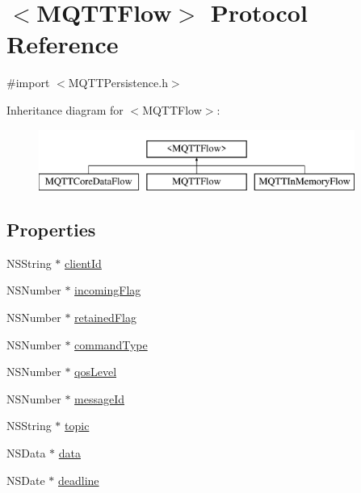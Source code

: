 \hypertarget{protocol_m_q_t_t_flow-p}{}\section{$<$M\+Q\+T\+T\+Flow$>$ Protocol Reference}
\label{protocol_m_q_t_t_flow-p}


{\ttfamily \#import $<$M\+Q\+T\+T\+Persistence.\+h$>$}

Inheritance diagram for $<$M\+Q\+T\+T\+Flow$>$\+:\begin{figure}[H]
\begin{center}
\leavevmode
\includegraphics[height=2.000000cm]{protocol_m_q_t_t_flow-p}
\end{center}
\end{figure}
\subsection*{Properties}
\begin{DoxyCompactItemize}
\item 
N\+S\+String $\ast$ \hyperlink{protocol_m_q_t_t_flow-p_adcecd8d7fb46a9ee206eee3aa55317ab}{client\+Id}
\item 
N\+S\+Number $\ast$ \hyperlink{protocol_m_q_t_t_flow-p_a020ab7c2407db69e70f6d649ec1b7908}{incoming\+Flag}
\item 
N\+S\+Number $\ast$ \hyperlink{protocol_m_q_t_t_flow-p_a923204eafe7a147c22f9cccd0e1e757f}{retained\+Flag}
\item 
N\+S\+Number $\ast$ \hyperlink{protocol_m_q_t_t_flow-p_a08a38c51f8220a7af42fc2e3d2eb9969}{command\+Type}
\item 
N\+S\+Number $\ast$ \hyperlink{protocol_m_q_t_t_flow-p_aec73f69c40a179fa9419a45af1967e6b}{qos\+Level}
\item 
N\+S\+Number $\ast$ \hyperlink{protocol_m_q_t_t_flow-p_aebfe27d14d007dbbe4c0f707fb39dc00}{message\+Id}
\item 
N\+S\+String $\ast$ \hyperlink{protocol_m_q_t_t_flow-p_ad218ad5cb39f49c477ab92b1e6d408dc}{topic}
\item 
N\+S\+Data $\ast$ \hyperlink{protocol_m_q_t_t_flow-p_a50900cbdfdf270e47fccaa9fee560e25}{data}
\item 
N\+S\+Date $\ast$ \hyperlink{protocol_m_q_t_t_flow-p_af5c0d997c85856cfdad2eab9e425b01a}{deadline}
\end{DoxyCompactItemize}


